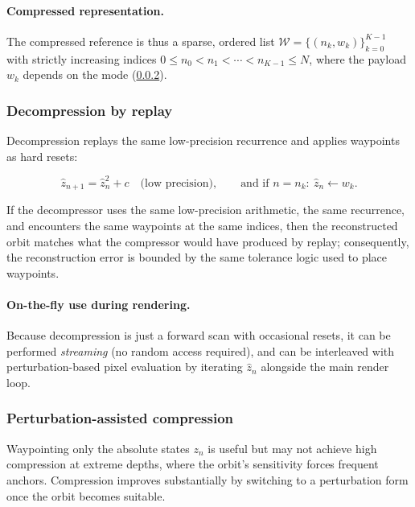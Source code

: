 \paragraph{Compressed representation.}
The compressed reference is thus a sparse, ordered list
\(
\mathcal{W} = \{(n_k, w_k)\}_{k=0}^{K-1}
\)
with strictly increasing indices \(0 \le n_0 < n_1 < \cdots < n_{K-1} \le N\),
where the payload \(w_k\) depends on the mode (\cref{sec:refcomp-pert}).

\subsubsection{Decompression by replay}

Decompression replays the same low-precision recurrence and applies waypoints as
hard resets:

\begin{equation}
  \hat z_{n+1} = \hat z_n^2 + c \quad\text{(low precision)},\qquad
  \text{and if } n = n_k:\ \hat z_n \leftarrow w_k.
\end{equation}

If the decompressor uses the same low-precision arithmetic, the same recurrence,
and encounters the same waypoints at the same indices, then the reconstructed
orbit matches what the compressor would have produced by replay; consequently,
the reconstruction error is bounded by the same tolerance logic used to place
waypoints.

\paragraph{On-the-fly use during rendering.}
Because decompression is just a forward scan with occasional resets, it can be
performed \emph{streaming} (no random access required), and can be interleaved
with perturbation-based pixel evaluation by iterating \(\hat z_n\) alongside the
main render loop.

\subsubsection{Perturbation-assisted compression}

\label{sec:refcomp-pert}
Waypointing only the absolute states \(z_n\) is useful but may not achieve high
compression at extreme depths, where the orbit's sensitivity forces frequent
anchors.  Compression improves substantially by switching to a perturbation form
once the orbit becomes suitable.

